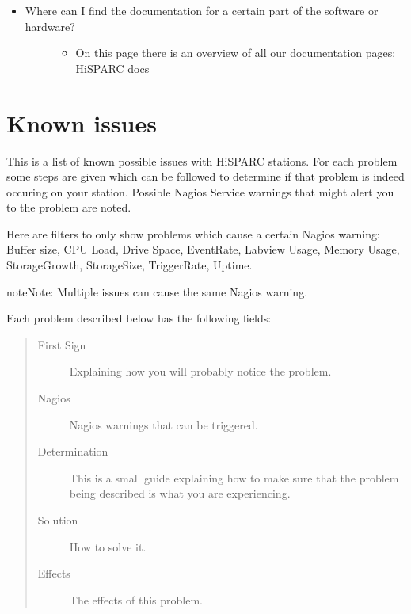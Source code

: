 \documentclass[a4paper,11pt,english]{sphinxmanual}
\begin{document}
\begin{itemize}
\begin{description}
\begin{itemize}
\end{itemize}

\end{description}

\item {} \begin{description}
\item[{Where can I find the documentation for a certain part of the software or hardware?}] \leavevmode\begin{itemize}
\item {} 
On this page there is an overview of all our documentation pages: \href{http://docs.hisparc.nl/}{HiSPARC docs}

\end{itemize}

\end{description}

\end{itemize}


\chapter{Known issues}
\label{known-issues:known-issues}\label{known-issues::doc}
This is a list of known possible issues with HiSPARC stations. For
each problem some steps are given which can be followed to determine if
that problem is indeed occuring on your station. Possible Nagios Service
warnings that might alert you to the problem are noted.

Here are filters to only show problems which cause a certain Nagios warning:
Buffer size,
CPU Load,
Drive Space,
EventRate,
Labview Usage,
Memory Usage,
StorageGrowth,
StorageSize,
TriggerRate,
Uptime.

\begin{notice}{note}{Note:}
Multiple issues can cause the same Nagios warning.
\end{notice}

Each problem described below has the following fields:
\begin{quote}\begin{description}
\item[{First Sign}] \leavevmode
Explaining how you will probably notice the problem.

\item[{Nagios}] \leavevmode
Nagios warnings that can be triggered.

\item[{Determination}] \leavevmode
This is a small guide explaining how to make sure that
the problem being described is what you are experiencing.

\item[{Solution}] \leavevmode
How to solve it.

\item[{Effects}] \leavevmode
The effects of this problem.

\end{description}\end{quote}
\end{document}
